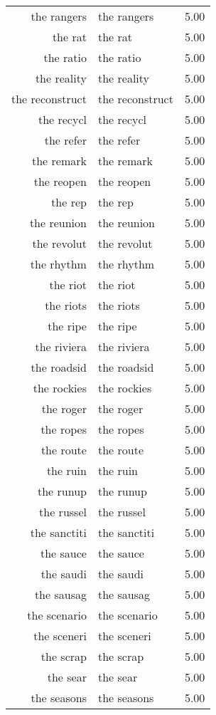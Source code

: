 \begin{table}[ht]
\begin{tabular}{rlr}
  the rangers & the rangers & 5.00 \\ 
  the rat & the rat & 5.00 \\ 
  the ratio & the ratio & 5.00 \\ 
  the reality & the reality & 5.00 \\ 
  the reconstruct & the reconstruct & 5.00 \\ 
  the recycl & the recycl & 5.00 \\ 
  the refer & the refer & 5.00 \\ 
  the remark & the remark & 5.00 \\ 
  the reopen & the reopen & 5.00 \\ 
  the rep & the rep & 5.00 \\ 
  the reunion & the reunion & 5.00 \\ 
  the revolut & the revolut & 5.00 \\ 
  the rhythm & the rhythm & 5.00 \\ 
  the riot & the riot & 5.00 \\ 
  the riots & the riots & 5.00 \\ 
  the ripe & the ripe & 5.00 \\ 
  the riviera & the riviera & 5.00 \\ 
  the roadsid & the roadsid & 5.00 \\ 
  the rockies & the rockies & 5.00 \\ 
  the roger & the roger & 5.00 \\ 
  the ropes & the ropes & 5.00 \\ 
  the route & the route & 5.00 \\ 
  the ruin & the ruin & 5.00 \\ 
  the runup & the runup & 5.00 \\ 
  the russel & the russel & 5.00 \\ 
  the sanctiti & the sanctiti & 5.00 \\ 
  the sauce & the sauce & 5.00 \\ 
  the saudi & the saudi & 5.00 \\ 
  the sausag & the sausag & 5.00 \\ 
  the scenario & the scenario & 5.00 \\ 
  the sceneri & the sceneri & 5.00 \\ 
  the scrap & the scrap & 5.00 \\ 
  the sear & the sear & 5.00 \\ 
  the seasons & the seasons & 5.00 \\ 

\end{tabular}
\end{table}
